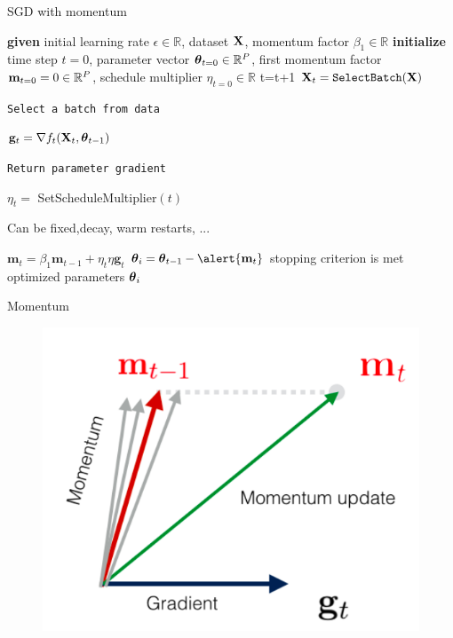 \documentclass[xcolor=pdftex,dvipsnames,table,mathserif]{beamer}
\begin{document}
\begin{frame}{SGD with momentum \cite{Qian99}}
\begin{algorithm}[H]
\begin{algorithmic}[1]
\STATE \textbf{given} initial learning rate $\epsilon \in \mathbb{R}$, dataset $\mathbf{X}$, \alert{momentum factor $\beta_1 \in \mathbb{R}$}
\STATE \textbf{initialize} time step $t=0$, parameter vector $\boldsymbol{\theta}_{t=0} \in \mathbb{R}^P$, first momentum factor $\mathbf{m}_{t=0}=0 \in \mathbb{R}^P$, schedule multiplier $\eta_{t=0} \in \mathbb{R}$
\REPEAT
\STATE t=t+1
\STATE $\mathbf{X}_t=\texttt{SelectBatch} (\mathbf{X})$ \begin{tiny}\texttt{Select a batch from data} \end{tiny}
\STATE $\mathbf{g}_t = \nabla f_t(\mathbf{X}_t,\boldsymbol{\theta}_{t-1})$ \begin{tiny}\texttt{Return parameter gradient} \end{tiny}
\STATE $\eta_t = $ SetScheduleMultiplier$(t)$ \begin{tiny}{Can be fixed,decay, warm restarts, ...}\end{tiny}
\STATE \alert{$\mathbf{m}_t = \beta_1 \mathbf{m}_{t-1} + \eta_{t} \eta  \mathbf{g}_t $}
\STATE $\param_i=\param_{t-1} - \alert{\mathbf{m}_{t}}$
\UNTIL stopping criterion is met
\RETURN optimized parameters $\boldsymbol{\theta}_i$
\end{algorithmic}
\caption{pseudocode for stochastic gradient descent \alert{with Momentum} }
\label{alg:seq}
\end{algorithm}
\end{frame}

\begin{frame}{Momentum}
\begin{figure}
\includegraphics[width=.95\columnwidth]{../graphics/Momentum}
\end{figure}
\end{frame}
\end{document}
